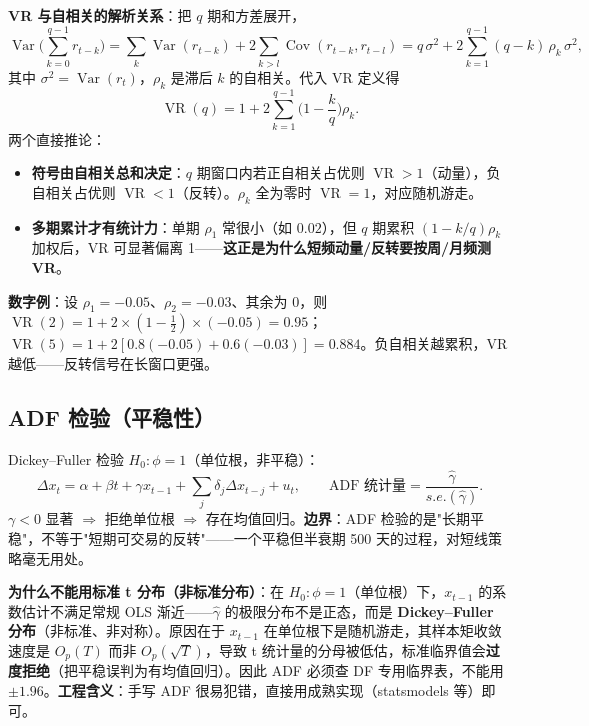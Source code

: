 \documentclass[UTF8,11pt]{ctexart}
\begin{document}
\textbf{VR 与自相关的解析关系}：把 $q$ 期和方差展开，
\begin{equation}
\operatorname{Var}\Big(\sum_{k=0}^{q-1} r_{t-k}\Big)
= \sum_{k}\operatorname{Var}(r_{t-k}) + 2\sum_{k>l}\operatorname{Cov}(r_{t-k},r_{t-l})
= q\,\sigma^2 + 2\sum_{k=1}^{q-1}(q-k)\,\rho_k\,\sigma^2,
\end{equation}
其中 $\sigma^2=\operatorname{Var}(r_t)$，$\rho_k$ 是滞后 $k$ 的自相关。代入 VR 定义得
\begin{equation}
\boxed{\;\operatorname{VR}(q) = 1 + 2\sum_{k=1}^{q-1}\Big(1-\frac{k}{q}\Big)\rho_k.\;}
\end{equation}
两个直接推论：
\begin{itemize}[itemsep=2pt]
\item \textbf{符号由自相关总和决定}：$q$ 期窗口内若正自相关占优则 $\operatorname{VR}>1$（动量），负自相关占优则 $\operatorname{VR}<1$（反转）。$\rho_k$ 全为零时 $\operatorname{VR}=1$，对应随机游走。
\item \textbf{多期累计才有统计力}：单期 $\rho_1$ 常很小（如 $0.02$），但 $q$ 期累积 $(1-k/q)\rho_k$ 加权后，VR 可显著偏离 1——\textbf{这正是为什么短频动量/反转要按周/月频测 VR}。
\end{itemize}
\textbf{数字例}：设 $\rho_1=-0.05$、$\rho_2=-0.03$、其余为 0，则 $\operatorname{VR}(2)=1+2\times(1-\tfrac12)\times(-0.05)=0.95$；$\operatorname{VR}(5)=1+2[0.8(-0.05)+0.6(-0.03)]=0.884$。负自相关越累积，VR 越低——反转信号在长窗口更强。

\subsection{ADF 检验（平稳性）}
Dickey--Fuller 检验 $H_0:\phi=1$（单位根，非平稳）：
\begin{equation}
\Delta x_t = \alpha + \beta t + \gamma x_{t-1} + \sum_{j}\delta_j \Delta x_{t-j} + u_t,
\qquad \text{ADF 统计量} = \frac{\hat\gamma}{s.e.(\hat\gamma)}.
\end{equation}
$\gamma<0$ 显著 $\Rightarrow$ 拒绝单位根 $\Rightarrow$ 存在均值回归。\textbf{边界}：ADF 检验的是"长期平稳"，不等于"短期可交易的反转"——一个平稳但半衰期 500 天的过程，对短线策略毫无用处。

\textbf{为什么不能用标准 t 分布（非标准分布）}：在 $H_0:\phi=1$（单位根）下，$x_{t-1}$ 的系数估计不满足常规 OLS 渐近——$\hat\gamma$ 的极限分布不是正态，而是 \textbf{Dickey--Fuller 分布}（非标准、非对称）。原因在于 $x_{t-1}$ 在单位根下是随机游走，其样本矩收敛速度是 $O_p(T)$ 而非 $O_p(\sqrt T)$，导致 t 统计量的分母被低估，标准临界值会\textbf{过度拒绝}（把平稳误判为有均值回归）。因此 ADF 必须查 DF 专用临界表，不能用 $\pm1.96$。\textbf{工程含义}：手写 ADF 很易犯错，直接用成熟实现（statsmodels 等）即可。
\end{document}
